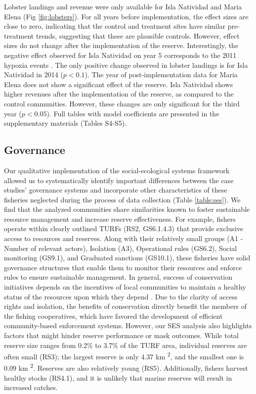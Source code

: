 \documentclass{frontiersSCNS}
\begin{document}
Lobster landings and revenue were only available for Isla Natividad and Maria Elena (Fig \ref{fig:lobsters}). For all years before implementation, the effect sizes are close to zero, indicating that the control and treatment sites have similar pre-treatment trends, suggesting that these are plausible controls. However, effect sizes do not change after the implementation of the reserve. Interestingly, the negative effect observed for Isla Natividad on year 5 corresponds to the 2011 hypoxia events \citep{micheli_2012-EU}. The only positive change observed in lobster landings is for Isla Natividad in 2014 (\(p < 0.1\)). The year of post-implementation data for Maria Elena does not show a significant effect of the reserve. Isla Natividad shows higher revenues after the implementation of the reserve, as compared to the control communities. However, these changes are only significant for the third year (\(p < 0.05\)). Full tables with model coefficients are presented in the supplementary materials (Tables S4-S5).

\hypertarget{governance}{%
\subsection{Governance}\label{governance}}

Our qualitative implementation of the social-ecological systems framework allowed us to systematically identify important differences between the case studies' governance systems and incorporate other characteristics of these fisheries neglected during the process of data collection (Table \ref{table:ses}). We find that the analyzed communities share similarities known to foster sustainable resource management and increase reserve effectiveness. For example, fishers operate within clearly outlined TURFs (RS2, GS6.1.4.3) that provide exclusive access to resources and reserves. Along with their relatively small groups (A1 - Number of relevant actors), Isolation (A3), Operational rules (GS6.2), Social monitoring (GS9.1), and Graduated sanctions (GS10.1), these fisheries have solid governance structures that enable them to monitor their resources and enforce rules to ensure sustainable management. In general, success of conservation initiatives depends on the incentives of local communities to maintain a healthy status of the resources upon which they depend \citep{jupiter_2017}. Due to the clarity of access rights and isolation, the benefits of conservation directly benefit the members of the fishing cooperatives, which have favored the development of efficient community-based enforcement systems. However, our SES analysis also highlights factors that might hinder reserve performance or mask outcomes. While total reserve size ranges from 0.2\% to 3.7\% of the TURF area, individual reserves are often small (RS3); the largest reserve is only 4.37 km \textsuperscript{2}, and the smallest one is 0.09 km \textsuperscript{2}. Reserves are also relatively young (RS5). Additionally, fishers harvest healthy stocks (RS4.1), and it is unlikely that marine reserves will result in increased catches.
\end{document}
